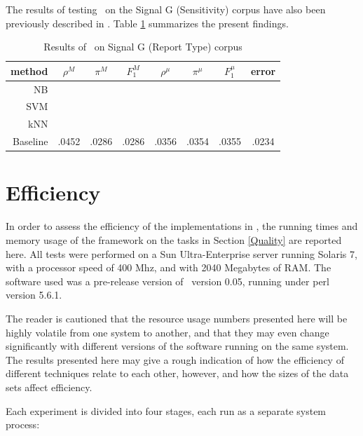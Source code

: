 The results of testing \aicat\ on the Signal G (Sensitivity) corpus
have also been previously described in \cite{calvo:02}.  Table
\ref{signalg-rt-results} summarizes the present findings.

\begin{table}
\begin{center}
\begin{tabular}{|r c c c c c c c|}
\hline
method    & $\rho^M$ & $\pi^M$ & $F_1^M$ & $\rho^\mu$ & $\pi^\mu$ & $F_1^\mu$ &   error \\
\hline
NB        \\
SVM       \\
kNN       \\
Baseline  &   .0452  &  .0286  &  .0286  &  .0356     &  .0354    &  .0355    &  .0234  \\
\hline
\end{tabular}
\end{center}
\caption{Results of \aicat\ on Signal G (Report Type) corpus}
\label{signalg-rt-results}
\end{table}

\section{Efficiency}
\label{Efficiency}

In order to assess the efficiency of the implementations in \aicat,
the running times and memory usage of the framework on the tasks in
Section \ref{Quality} are reported here.  All tests were performed on
a Sun Ultra-Enterprise server running Solaris 7, with a processor
speed of 400 Mhz, and with 2040 Megabytes of RAM.  The software used
was a pre-release version of \aicat\ version 0.05, running under perl
version 5.6.1.

The reader is cautioned that the resource usage numbers presented here
will be highly volatile from one system to another, and that they may
even change significantly with different versions of the software
running on the same system.  The results presented here may give a
rough indication of how the efficiency of different techniques relate
to each other, however, and how the sizes of the data sets affect
efficiency.

Each experiment is divided into four stages, each run as a separate
system process:

